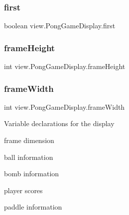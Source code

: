 \hypertarget{classview_1_1_pong_game_display_aeb378cbf5a0a37e9105c9748910f3513}{}\label{classview_1_1_pong_game_display_aeb378cbf5a0a37e9105c9748910f3513} 
\subsubsection{\texorpdfstring{first}{first}}
{\footnotesize\ttfamily boolean view.\+Pong\+Game\+Display.\+first\hspace{0.3cm}{\ttfamily [private]}}

\hypertarget{classview_1_1_pong_game_display_a1263ea81d63ff3e12b37fee42225a22e}{}\label{classview_1_1_pong_game_display_a1263ea81d63ff3e12b37fee42225a22e} 
\subsubsection{\texorpdfstring{frame\+Height}{frameHeight}}
{\footnotesize\ttfamily int view.\+Pong\+Game\+Display.\+frame\+Height\hspace{0.3cm}{\ttfamily [private]}}

\hypertarget{classview_1_1_pong_game_display_aacbf5c26433ea74107021b461af657c1}{}\label{classview_1_1_pong_game_display_aacbf5c26433ea74107021b461af657c1} 
\subsubsection{\texorpdfstring{frame\+Width}{frameWidth}}
{\footnotesize\ttfamily int view.\+Pong\+Game\+Display.\+frame\+Width\hspace{0.3cm}{\ttfamily [private]}}

Variable declarations for the display
\begin{DoxyItemize}
\item frame dimension
\item ball information
\item bomb information
\item player scores
\item paddle information 
\end{DoxyItemize}\hypertarget{classview_1_1_pong_game_display_a38f4635d73ef3c3986ad8a351b6f7a69}{}\label{classview_1_1_pong_game_display_a38f4635d73ef3c3986ad8a351b6f7a69} 
